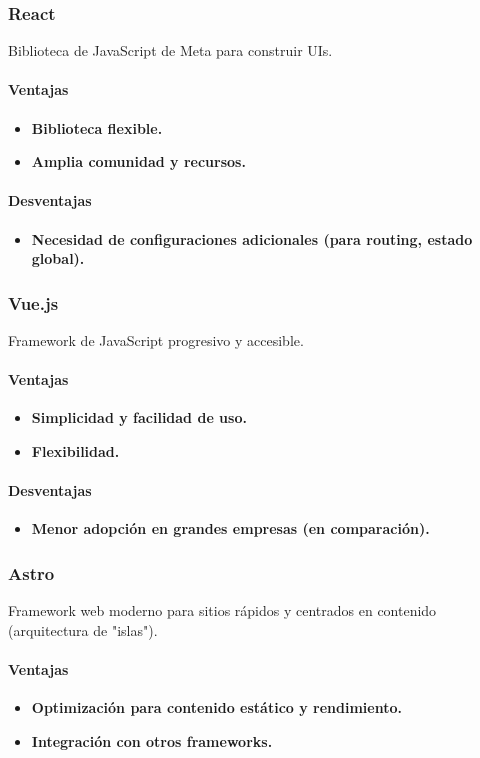 \subsubsection{React}
Biblioteca de JavaScript de Meta para construir UIs.
\paragraph{Ventajas}
\begin{itemize}
\item \textbf{Biblioteca flexible.}
\item \textbf{Amplia comunidad y recursos.}
\end{itemize}
\paragraph{Desventajas}
\begin{itemize}
\item \textbf{Necesidad de configuraciones adicionales (para routing, estado global).}
\end{itemize}

\subsubsection{Vue.js}
Framework de JavaScript progresivo y accesible.
\paragraph{Ventajas}
\begin{itemize}
\item \textbf{Simplicidad y facilidad de uso.}
\item \textbf{Flexibilidad.}
\end{itemize}
\paragraph{Desventajas}
\begin{itemize}
\item \textbf{Menor adopción en grandes empresas (en comparación).}
\end{itemize}

\subsubsection{Astro}
Framework web moderno para sitios rápidos y centrados en contenido (arquitectura de "islas").
\paragraph{Ventajas}
\begin{itemize}
\item \textbf{Optimización para contenido estático y rendimiento.}
\item \textbf{Integración con otros frameworks.}
\end{itemize}
